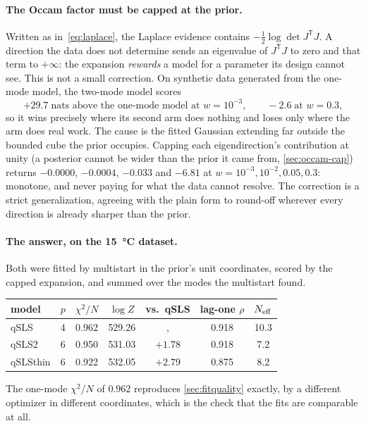 \documentclass[10pt]{article}
\begin{document}
\paragraph{The Occam factor must be capped at the prior.} Written as
in~\eqref{eq:laplace}, the Laplace evidence contains $-\tfrac12\log\det J^{\mathsf T}J$. A
direction the data does not determine sends an eigenvalue of $J^{\mathsf T}J$ to zero and
that term to $+\infty$: the expansion \emph{rewards} a model for a parameter its design
cannot see. This is not a small correction. On synthetic data generated from the one-mode
model, the two-mode model scores
%
\begin{equation*}
+29.7 \;\text{nats above the one-mode model at } w = 10^{-3},
\qquad
-2.6 \;\text{at } w = 0.3,
\end{equation*}
%
so it wins precisely where its second arm does nothing and loses only where the arm does
real work. The cause is the fitted Gaussian extending far outside the bounded cube the prior
occupies. Capping each eigendirection's contribution at unity (a posterior cannot be wider
than the prior it came from, \cref{sec:occam-cap}) returns $-0.0000$, $-0.0004$, $-0.033$
and $-6.81$ at $w = 10^{-3}, 10^{-2}, 0.05, 0.3$: monotone, and never paying for what the
data cannot resolve. The correction is a strict generalization, agreeing with the plain form
to round-off wherever every direction is already sharper than the prior.

\paragraph{The answer, on the \SI{15}{\celsius} dataset.} Both were fitted by multistart in
the prior's unit coordinates, scored by the capped expansion, and summed over the modes the
multistart found.
%
\begin{center}
\begin{tabular}{lcccccc}
\toprule
model & $p$ & $\chi^2/N$ & $\log Z$ & vs.\ qSLS & lag-one $\rho$ & $N_{\rm eff}$ \\
\midrule
qSLS      & 4 & 0.962 & 529.26 &, & 0.918 & 10.3 \\
qSLS2     & 6 & 0.950 & 531.03 & $+1.78$ & 0.918 & \phantom{0}7.2 \\
qSLSthin  & 6 & 0.922 & 532.05 & $+2.79$ & 0.875 & \phantom{0}8.2 \\
\bottomrule
\end{tabular}
\end{center}
%
The one-mode $\chi^2/N$ of $0.962$ reproduces \cref{sec:fitquality} exactly, by a different
optimizer in different coordinates, which is the check that the fits are comparable at all.
\end{document}
